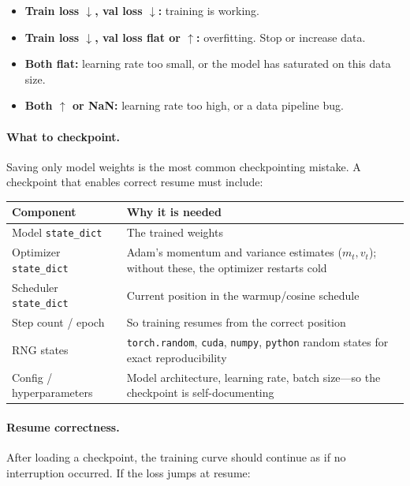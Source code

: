 \begin{itemize}[nosep]
  \item \textbf{Train loss $\downarrow$, val loss $\downarrow$:} training is working.
  \item \textbf{Train loss $\downarrow$, val loss flat or $\uparrow$:} overfitting. Stop or increase data.
  \item \textbf{Both flat:} learning rate too small, or the model has saturated on this data size.
  \item \textbf{Both $\uparrow$ or NaN:} learning rate too high, or a data pipeline bug.
\end{itemize}

\paragraph{What to checkpoint.} Saving only model weights is the most common checkpointing mistake. A checkpoint that enables correct resume must include:

\begin{center}
\begin{tabularx}{\textwidth}{@{}l X@{}}
\toprule
\textbf{Component} & \textbf{Why it is needed} \\
\midrule
Model \texttt{state\_dict} & The trained weights \\
Optimizer \texttt{state\_dict} & Adam's momentum and variance estimates ($m_t, v_t$); without these, the optimizer restarts cold \\
Scheduler \texttt{state\_dict} & Current position in the warmup/cosine schedule \\
Step count / epoch & So training resumes from the correct position \\
RNG states & \texttt{torch.random}, \texttt{cuda}, \texttt{numpy}, \texttt{python} random states for exact reproducibility \\
Config / hyperparameters & Model architecture, learning rate, batch size---so the checkpoint is self-documenting \\
\bottomrule
\end{tabularx}
\end{center}

\paragraph{Resume correctness.} After loading a checkpoint, the training curve should continue as if no interruption occurred. If the loss jumps at resume:


